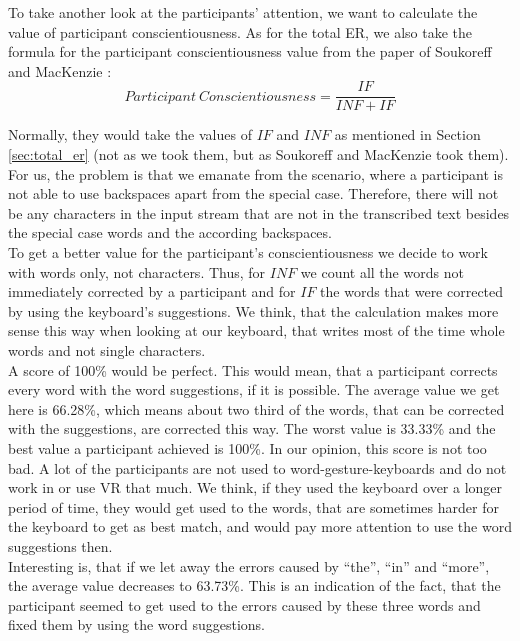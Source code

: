 To take another look at the participants' attention, we want to calculate the value of participant conscientiousness. As for the total ER, we also take the formula for the participant conscientiousness value from the paper of Soukoreff and MacKenzie \cite{10.1145/642611.642632}:
\begin{equation}
    Participant\ Conscientiousness = \frac{IF}{INF + IF}
    \label{eq:total_er}
\end{equation}

Normally, they would take the values of $IF$ and $INF$ as mentioned in Section \ref{sec:total_er} (not as we took them, but as Soukoreff and MacKenzie \cite{10.1145/642611.642632} took them). For us, the problem is that we emanate from the scenario, where a participant is not able to use backspaces apart from the special case. Therefore, there will not be any characters in the input stream that are not in the transcribed text besides the special case words and the according backspaces.\\
To get a better value for the participant's conscientiousness we decide to work with words only, not characters. Thus, for $INF$ we count all the words not immediately corrected by a participant and for $IF$ the words that were corrected by using the keyboard's suggestions. We think, that the calculation makes more sense this way when looking at our keyboard, that writes most of the time whole words and not single characters.\\
A score of 100\% would be perfect. This would mean, that a participant corrects every word with the word suggestions, if it is possible. The average value we get here is 66.28\%, which means about two third of the words, that can be corrected with the suggestions, are corrected this way. The worst value is 33.33\% and the best value a participant achieved is 100\%. In our opinion, this score is not too bad. A lot of the participants are not used to word-gesture-keyboards and do not work in or use VR that much. We think, if they used the keyboard over a longer period of time, they would get used to the words, that are sometimes harder for the keyboard to get as best match, and would pay more attention to use the word suggestions then.\\
Interesting is, that if we let away the errors caused by ``the'', ``in'' and ``more'', the average value decreases to 63.73\%. This is an indication of the fact, that the participant seemed to get used to the errors caused by these three words and fixed them by using the word suggestions.


